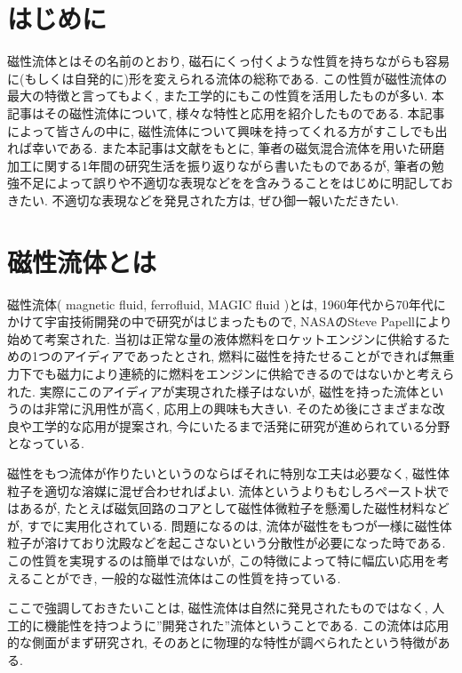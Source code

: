 \documentclass[b5,twocolumn,11pt]{jarticle}
\begin{document}
\section{はじめに}
磁性流体とはその名前のとおり, 磁石にくっ付くような性質を持ちながらも容易に(もしくは自発的に)形を変えられる流体の総称である. この性質が磁性流体の最大の特徴と言ってもよく, また工学的にもこの性質を活用したものが多い. 本記事はその磁性流体について, 様々な特性と応用を紹介したものである. 本記事によって皆さんの中に, 磁性流体について興味を持ってくれる方がすこしでも出れば幸いである. また本記事は文献\cite{No7_磁性流体}をもとに, 筆者の磁気混合流体を用いた研磨加工に関する1年間の研究生活を振り返りながら書いたものであるが, 筆者の勉強不足によって誤りや不適切な表現などをを含みうることをはじめに明記しておきたい. 不適切な表現などを発見された方は, ぜひ御一報いただきたい. 

\section{磁性流体とは}
磁性流体( magnetic fluid, ferrofluid, MAGIC fluid )とは, 1960年代から70年代にかけて宇宙技術開発の中で研究がはじまったもので, NASAのSteve Papellにより始めて考案された\cite{No7_SP}. 当初は正常な量の液体燃料をロケットエンジンに供給するための1つのアイディアであったとされ, 燃料に磁性を持たせることができれば無重力下でも磁力により連続的に燃料をエンジンに供給できるのではないかと考えられた. 実際にこのアイディアが実現された様子はないが, 磁性を持った流体というのは非常に汎用性が高く, 応用上の興味も大きい. そのため後にさまざまな改良や工学的な応用が提案され, 今にいたるまで活発に研究が進められている分野となっている. \par
磁性をもつ流体が作りたいというのならばそれに特別な工夫は必要なく, 磁性体粒子を適切な溶媒に混ぜ合わせればよい. 流体というよりもむしろペースト状ではあるが, たとえば磁気回路のコアとして磁性体微粒子を懸濁した磁性材料などが, すでに実用化されている. 問題になるのは, 流体が磁性をもつが一様に磁性体粒子が溶けており沈殿などを起こさないという分散性が必要になった時である. この性質を実現するのは簡単ではないが, この特徴によって特に幅広い応用を考えることができ, 一般的な磁性流体はこの性質を持っている. \par
ここで強調しておきたいことは, 磁性流体は自然に発見されたものではなく, 人工的に機能性を持つように”開発された”流体ということである. この流体は応用的な側面がまず研究され, そのあとに物理的な特性が調べられたという特徴がある. 
\end{document}
